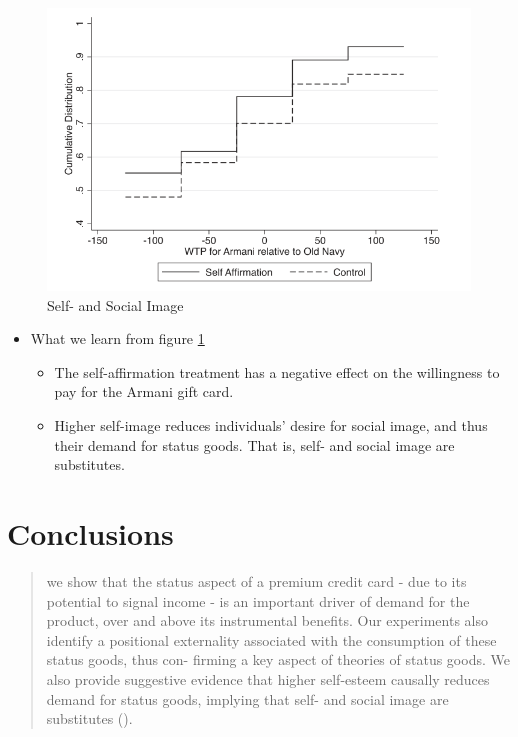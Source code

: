 \documentclass[../root]{subfiles}
\begin{document}
    \begin{figure}[h]
        \centering
        \includegraphics[width = 0.8\linewidth]{0717kato/result_exp3.PNG}
        \caption{Self- and Social Image}
        \label{result4}
    \end{figure}

    \begin{itemize}
        \item What we learn from figure \ref{result4}
        \begin{itemize}
            \item The self-affirmation treatment has a negative effect on the willingness to pay for the Armani gift card.
            \item Higher self-image reduces individuals' desire for social image, and thus their demand for status goods. That is, self- and social image are substitutes.
        \end{itemize}
    \end{itemize}


    \section{Conclusions}

    \begin{quote}
        we show that the status aspect of a premium credit card - due to its potential to signal income - is an important driver of demand for the product, over and above its instrumental benefits. Our experiments also identify a positional externality associated with the consumption of these status goods, thus con- firming a key aspect of theories of status goods. We also provide suggestive evidence that higher self-esteem causally reduces demand for status goods, implying that self- and social image are substitutes (\citealp[p.1593]{Bursztyn2018}).
    \end{quote}



    \biblio
\end{document}
